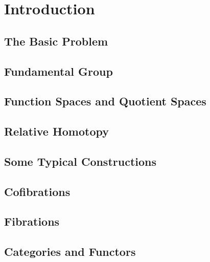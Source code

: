 \documentclass[11pt, a4paper]{article}
\title{\notestitle}
\author{\notesauthor}
\date{\notesdate}
\begin{document}
\maketitle
\tableofcontents
\newpage

\section{Introduction}

\subsection{The Basic Problem}

\subsection{Fundamental Group}

\subsection{Function Spaces and Quotient Spaces}

\subsection{Relative Homotopy}

\subsection{Some Typical Constructions}

\subsection{Cofibrations}

\subsection{Fibrations}

\subsection{Categories and Functors}

\end{document}

